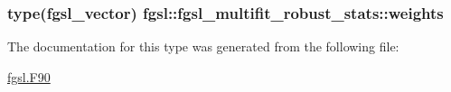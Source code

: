 \subsubsection[{weights}]{\setlength{\rightskip}{0pt plus 5cm}type({\bf fgsl\+\_\+vector}) fgsl\+::fgsl\+\_\+multifit\+\_\+robust\+\_\+stats\+::weights}\label{structfgsl_1_1fgsl__multifit__robust__stats_a767002a21069053a5a5c8143a1903814}


The documentation for this type was generated from the following file\+:\begin{DoxyCompactItemize}
\item 
\hyperlink{fgsl_8F90}{fgsl.\+F90}\end{DoxyCompactItemize}
